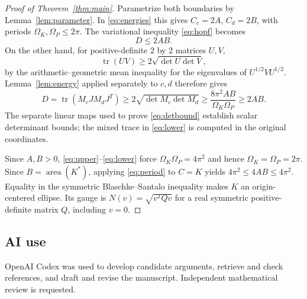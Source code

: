 \documentclass[11pt]{amsart}
\theoremstyle{remark}
\newcommand{\area}{\operatorname{area}}
\newcommand{\tr}{\operatorname{tr}}
\begin{document}
\begin{proof}[Proof of Theorem~\ref{thm:main}]
Parametrize both boundaries by Lemma~\ref{lem:parameter}.
In \eqref{eq:energies} this gives $C_c=2A$, $C_d=2B$,
with periods $\Omega_K,\Omega_P\leq2\pi$.
The variational inequality \eqref{eq:hopf} becomes
\begin{equation}\label{eq:upper}
D\leq2AB.
\end{equation}
On the other hand, for positive-definite $2$ by $2$ matrices $U,V$,
\[
\tr(UV)\geq2\sqrt{\det U\det V},
\]
by the arithmetic--geometric mean inequality for the eigenvalues
of $U^{1/2}VU^{1/2}$.
Lemma~\ref{lem:energy} applied separately to $c,d$ therefore gives
\begin{equation}\label{eq:lower}
D=\tr(M_cJM_dJ^T)
\geq2\sqrt{\det M_c\det M_d}
\geq\frac{8\pi^2AB}{\Omega_K\Omega_P}
\geq2AB.
\end{equation}
The separate linear maps used to prove \eqref{eq:detbound} establish
scalar determinant bounds; the mixed trace in \eqref{eq:lower}
is computed in the original coordinates.

Since $A,B>0$, \eqref{eq:upper}--\eqref{eq:lower} force
$\Omega_K\Omega_P=4\pi^2$ and hence $\Omega_K=\Omega_P=2\pi$.
Since $B=\area(K^*)$, applying \eqref{eq:period} to $C=K$ yields
$4\pi^2\leq4AB\leq4\pi^2$.
Equality in the symmetric Blaschke--Santalo inequality makes $K$
an origin-centered ellipse. Its gauge is
$N(v)=\sqrt{v^TQv}$ for a real symmetric positive-definite matrix $Q$,
including $v=0$.
\end{proof}

\subsection*{AI use}
OpenAI Codex was used to develop candidate arguments, retrieve and check
references, and draft and revise the manuscript.
Independent mathematical review is requested.
\end{document}

